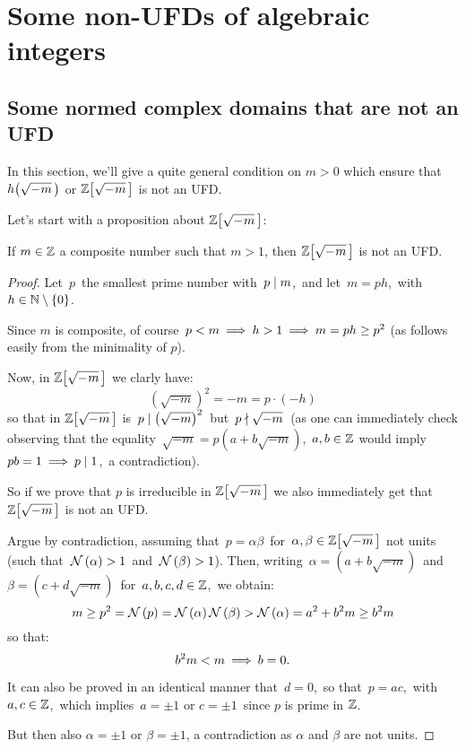 \chapter{Some non-UFDs of algebraic integers}\label{notUFD}

\section{Some normed complex domains that are not an UFD}

In this section, we'll give a quite general condition on $m > 0$
which ensure that $\hhm{m}$ or $\ZZM{m}$ is not an UFD.

\bigskip
Let's start with a proposition about $\ZZM{m}$:
\begin{thm}\label{m_neg_composite_implies_not_uniqueness_1}
If $m \in \mathbb{Z}$ a composite number such that $m > 1$, then
$\ZZM{m}$ is not an UFD.
\end{thm}

\begin{proof}
%
Let \,$p$\, the smallest prime number with\, $p \mid m$,
\,and let\, $m = ph$,\, with $h \in \mathbb{N}\setminus\left\{0\right\}$.

Since $m$ is composite, of course\, $p < m \:\Longrightarrow\: h > 1
\:\Longrightarrow\: m = ph \geq p^2$ (as follows easily from the
minimality of $p$).

Now, in $\ZZM{m}$ we clarly have:
$$\left(\sqrt{-m}\right)^2 = -m = p\cdot(-h)$$
so that in $\ZZM{m}$ is\, $p \mid \left(\sqrt{-m}\right)^2$
\,but\, $p \nmid \sqrt{-m}$\,
(as one can immediately check observing that the equality
\,$\sqrt{-m} = p(a + b \sqrt{-m})$,\, $a, b \in \mathbb{Z}$\: would
imply\, $pb = 1 \:\Longrightarrow\: p \mid 1$,\, a contradiction).

So if we prove that $p$ is irreducible in $\ZZM{m}$
we also immediately get that $\ZZM{m}$ is not an UFD.

Argue by contradiction, assuming that\, $p = \alpha\beta$\,
for\, $\alpha, \beta \in \ZZM{m}$ not units (\ie such
that\, $\mathcal{N}\left(\alpha\right) > 1$\, and\, $\mathcal{N}\left(\beta\right) > 1$).
Then, writing\, $\alpha = \left(a + b\sqrt{-m}\right)$\,
and \,$\beta = \left(c + d\sqrt{-m}\right)$ \,for\,
$a, b, c, d \in \mathbb{Z}$,\, we obtain:
$$
m \ge p^2 = \mathcal{N}\left(p\right) = \mathcal{N}\left(\alpha\right)\mathcal{N}\left(\beta\right) >
\mathcal{N}\left(\alpha\right) = a^2 + b^2 m \geq b^2 m
$$
so that:
$$ b^2 m < m \:\Longrightarrow\: b = 0. $$

It can also be proved in an identical manner that\,
$d = 0$,\, so that\, $p = ac$,\, with \,$a,c \in \mathbb{Z}$,\,
which implies\, $ a = \pm{1}$ or $c = \pm{1}$\, since
$p$ is prime in $\mathbb{Z}$.

But then also $\alpha = \pm 1$ or $\beta = \pm 1$, a contradiction
as $\alpha$ and $\beta$ are not units.
%
\end{proof}

